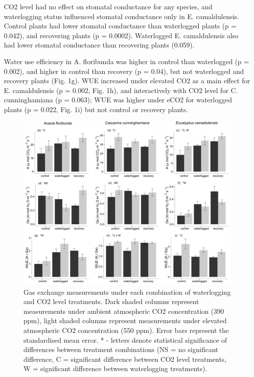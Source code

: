 \documentclass[12pt,a4paper]{memoir}
\begin{document}
CO2 level had no effect on stomatal conductance for any species, and waterlogging status influenced stomatal conductance only in E. camaldulensis. Control plants had lower stomatal conductance than waterlogged plants (p = 0.042), and recovering plants (p = 0.0002). Waterlogged E. camaldulensis also had lower stomatal conductance than recovering plants (0.059).

Water use efficiency in A. floribunda was higher in control than waterlogged (p = 0.002), and higher in control than recovery (p = 0.04), but not waterlogged and recovery plants (Fig. 1g). WUE increased under elevated CO2 as a main effect for E. camaldulensis (p = 0.002, Fig. 1h), and interactively with CO2 level for C. cunninghamiana (p = 0.063); WUE was higher under eCO2 for waterlogged plants (p = 0.022, Fig. 1i) but not control or recovery plants.

\begin{figure}[ht]
\begin{center}
\includegraphics[width=\linewidth,keepaspectratio=true]{gasexchange2.png} %
\caption[Gas exchange measurements under each combination of waterlogging and CO2 level treatments.]{\small{Gas exchange measurements under each combination of waterlogging and CO2 level treatments. Dark shaded columns represent measurements under ambient atmospheric CO2 concentration (390 ppm), light shaded columns represent measurements under elevated atmospheric CO2 concentration (550 ppm). Error bars represent the standardised mean error. * - letters denote statistical significance of differences between treatment combinations (NS = no significant difference, C = significant difference between CO2 level treatments, W = significant difference between waterlogging treatments).}} %
\label{Ch5_F1} %
\end{center}
\end{figure}
\end{document}
